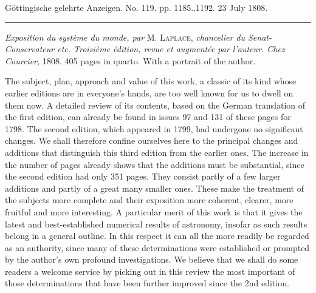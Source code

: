 \clearpage
{}
\begin{center}\small Göttingische gelehrte Anzeigen. No. 119. pp. 1185..1192. 23 July 1808.\\[3pt]\rule{.72\linewidth}{.3pt}\end{center}

\emph{Exposition du système du monde, par} M. \textsc{Laplace}, \emph{chancelier du Senat-Conservateur etc. Troisième édition, revue et augmentée par l'auteur. Chez Courcier,} 1808. 405 pages in quarto. With a portrait of the author.

The subject, plan, approach and value of this work, a classic of its kind whose earlier editions are in everyone’s hands, are too well known for us to dwell on them now. A detailed review of its contents, based on the German translation of the first edition, can already be found in issues 97 and 131 of these pages for 1798. The second edition, which appeared in 1799, had undergone no significant changes. We shall therefore confine ourselves here to the principal changes and additions that distinguish this third edition from the earlier ones. The increase in the number of pages already shows that the additions must be substantial, since the second edition had only 351 pages. They consist partly of a few larger additions and partly of a great many smaller ones. These make the treatment of the subjects more complete and their exposition more coherent, clearer, more fruitful and more interesting. A particular merit of this work is that it gives the latest and best-established numerical results of astronomy, insofar as such results belong in a general outline. In this respect it can all the more readily be regarded as an authority, since many of these determinations were established or prompted by the author’s own profound investigations. We believe that we shall do some readers a welcome service by picking out in this review the most important of those determinations that have been further improved since the 2nd edition.

